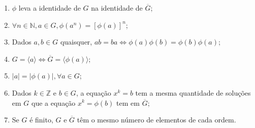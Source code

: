 	\begin{theorem}
		\label{isomorfismos em elementos}
		\begin{enumerate}
			\item \vspace{0.3cm} $\phi$ leva a identidade de $G$ na identidade de $\overline{G}$;
			\item $\forall n\in\mathbb{N}, a\in G, \phi (a^n) = [\phi (a)]^n$;
			\item Dados $a,b \in G$ quaisquer, $ab = ba \Leftrightarrow \phi (a)\phi (b) = \phi (b)\phi (a)$;
			\item $G = \langle a \rangle \Leftrightarrow \overline{G} = \langle\phi(a) \rangle$;
			\item $|a| = |\phi(a)|, \forall a\in G$;
			\item Dados $k\in\mathbb{Z}$ e $b\in G$, a equação $x^k = b$ tem a mesma quantidade de soluções em $G$ que a equação $x^k = \phi(b)$ tem em $\overline{G}$;
			\item Se $G$ é finito, $G$ e $\overline{G}$ têm o mesmo número de elementos de cada ordem. 
		\end{enumerate}
	\end{theorem}
	
